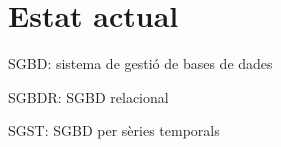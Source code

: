 \chapter{Estat actual}
\label{cap:estat}


SGBD: sistema de gestió de bases de dades

SGBDR: SGBD relacional

SGST: SGBD per sèries temporals











  




















